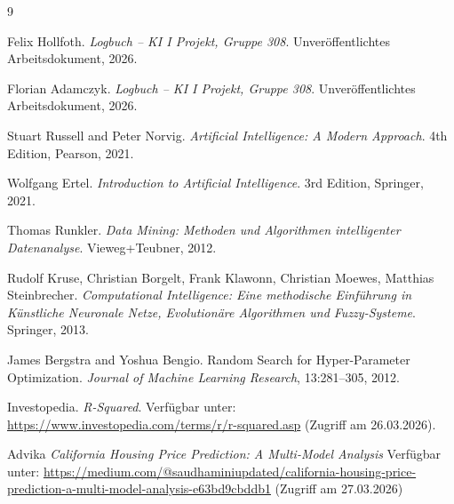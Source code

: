 \documentclass[9pt,a4paper,twocolumn,twoside]{tau-class/tau}
\begin{document}
\begin{thebibliography}{9}

Felix Hollfoth.
\textit{Logbuch – KI I Projekt, Gruppe 308}.
Unveröffentlichtes Arbeitsdokument, 2026.

Florian Adamczyk.
\textit{Logbuch – KI I Projekt, Gruppe 308}.
Unveröffentlichtes Arbeitsdokument, 2026.

Stuart Russell and Peter Norvig.
\textit{Artificial Intelligence: A Modern Approach}.
4th Edition, Pearson, 2021.

Wolfgang Ertel.
\textit{Introduction to Artificial Intelligence}.
3rd Edition, Springer, 2021.

Thomas Runkler.
\textit{Data Mining: Methoden und Algorithmen intelligenter Datenanalyse}.
Vieweg+Teubner, 2012.

Rudolf Kruse, Christian Borgelt, Frank Klawonn, Christian Moewes, Matthias Steinbrecher.
\textit{Computational Intelligence: Eine methodische Einführung in Künstliche Neuronale Netze, Evolutionäre Algorithmen und Fuzzy-Systeme}.
Springer, 2013.

James Bergstra and Yoshua Bengio.
Random Search for Hyper-Parameter Optimization.
\textit{Journal of Machine Learning Research}, 13:281–305, 2012.

Investopedia.
\textit{R-Squared}.
Verfügbar unter: \url{https://www.investopedia.com/terms/r/r-squared.asp} (Zugriff am 26.03.2026).

Advika
\textit{California Housing Price Prediction: A Multi-Model Analysis}
Verfügbar unter: \url{https://medium.com/@saudhaminiupdated/california-housing-price-prediction-a-multi-model-analysis-e63bd9cbddb1} (Zugriff am 27.03.2026)
\end{thebibliography}
\end{document}
